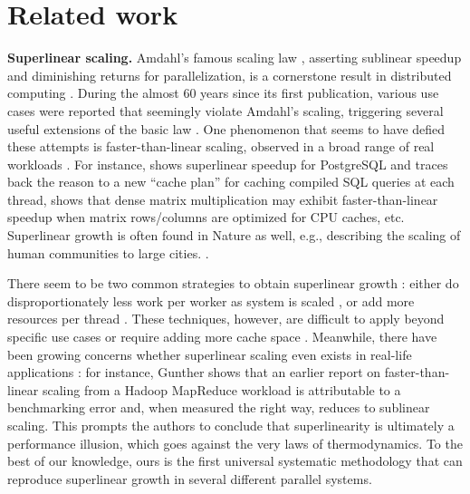 \section{Related work}
\label{sec:related-work}

\noindent%
\textbf{Superlinear scaling.} %
Amdahl's famous scaling law \cite{10.1145/1465482.1465560}, asserting sublinear speedup and diminishing returns for parallelization, is a cornerstone result in distributed computing \cite{10.1145/42411.42415, 10.5555/775339.775386,1580395, 10.5555/1951599, 10.1145/42411.42415}. During the almost 60 years since its first publication, various use cases were reported that seemingly violate Amdahl's scaling, triggering several useful extensions of the basic law \cite{4563876, 6280307, 406581, 6163449, 10.5555/1951599}. One phenomenon that seems to have defied these attempts is faster-than-linear scaling, observed in a broad range of real workloads \cite{scalability-analyzed, 10.5555/1012889.1012894, sdn-analytitcs, 556383, 7733347, 6483679, 10.1007/978-3-319-77610-1,dobb-1, dobb-2}. For instance, \cite{scalability-analyzed} shows superlinear speedup for PostgreSQL and traces back the reason to a new ``cache plan'' for caching compiled SQL queries at each thread, \cite{7733347} shows that dense matrix multiplication may exhibit faster-than-linear speedup when matrix rows\slash columns are optimized for CPU caches, etc. Superlinear growth is often found in Nature as well, e.g., describing the scaling of human communities to large cities. \cite{PhysRevE.79.016115}.

There seem to be two common strategies to obtain superlinear growth \cite{7733347, 80148}: either do disproportionately less work per worker as system is scaled \cite{7733347}, or add more resources per thread \cite{80148}. These techniques, however, are difficult to apply beyond specific use cases \cite{556383} or require adding more cache space \cite{7733347}. Meanwhile, there have been growing concerns whether superlinear scaling even exists in real-life applications \cite{10.1016/0167-8191(86)90024-4}: for instance, Gunther shows that an earlier report on faster-than-linear scaling from a Hadoop MapReduce workload is attributable to a benchmarking error and, when measured the right way, reduces to sublinear scaling. This prompts the authors to conclude that superlinearity is ultimately a performance illusion, which goes against the very laws of thermodynamics.  To the best of our knowledge, ours is the first universal systematic methodology that can reproduce superlinear growth in several different parallel systems.

